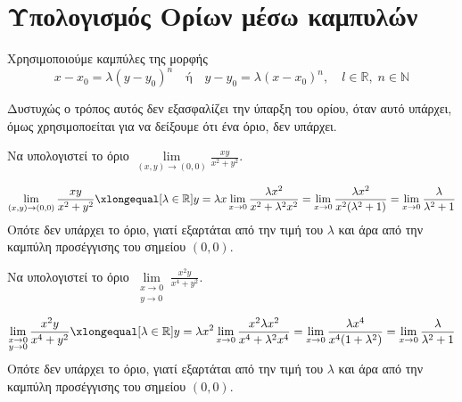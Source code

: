 \section{Υπολογισμός Ορίων μέσω καμπυλών}

Χρησιμοποιούμε καμπύλες της μορφής 
\[ 
  x - x_{0} = \lambda (y- y_{0})^{n} \quad \text{ή} 
  \quad y- y_{0} = \lambda (x- x_{0})^{n}, \quad l \in \mathbb{R}, \; n \in 
  \mathbb{N}  
\]

\begin{rem}
  Δυστυχώς ο τρόπος αυτός δεν εξασφαλίζει την ύπαρξη του ορίου, όταν αυτό υπάρχει, 
  όμως χρησιμοποείται για να δείξουμε ότι ένα όριο, δεν υπάρχει.
\end{rem}

\begin{example}
  Να υπολογιστεί το όριο $ \lim\limits_{(x,y)\to (0, 0)} \frac{xy}{x^{2}+y^{2}} $.
  \begin{solution}
    \[
      \lim\limits_{(x,y)\to (0, 0)} \frac{xy}{x^{2}+y^{2}} 
      \xlongequal[\lambda \in \mathbb{R}]{y= \lambda x} \lim_{x \to 0}
      \frac{\lambda x^{2}}{x^{2}+ \lambda^{2} x^{2}} = \lim_{x \to 0} 
      \frac{\lambda x^{2}}{x^{2}(\lambda ^{2}+1)} = \lim_{x \to 0} 
      \frac{\lambda}{\lambda ^{2}+1} 
    \]
    Οπότε δεν υπάρχει το όριο, γιατί εξαρτάται από την τιμή του 
    $ \lambda $ και άρα από την καμπύλη προσέγγισης του σημείου 
    $ (0,0) $.
  \end{solution}
\end{example}

\begin{example}
  Να υπολογιστεί το όριο $ \lim\limits_{\substack{x\to 0 \\y \to 0}} 
  \frac{x^{2}y}{x^{4}+y^{2}} $.
  \begin{solution}
    \[
      \lim\limits_{\substack{x\to 0 \\y \to 0}} 
      \frac{x^{2}y}{x^{4}+y^{2}} 
      \xlongequal[\lambda \in \mathbb{R}]{y= \lambda x^{2}} 
      \lim_{x \to 0} \frac{x^{2} \lambda x^{2}}
      {x^{4}+\lambda^{2}x^{4}} = \lim_{x\to 0} 
      \frac{\lambda x^{4}}{x^{4}(1+\lambda ^{2})} = 
      \lim_{x \to 0} \frac{\lambda}{\lambda ^{2}+1} 
    \] 
    Οπότε δεν υπάρχει το όριο, γιατί εξαρτάται από την τιμή του $ \lambda $ 
    και άρα από την καμπύλη προσέγγισης του σημείου $ (0,0) $.
  \end{solution}
\end{example}


